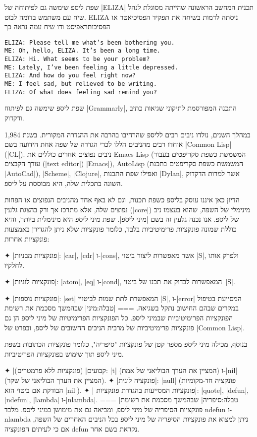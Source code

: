 שפת ליספ שימשה גם לפיתוחה של \E|ELIZA| תכנית המחשב הראשונה שהייתה מסוגלת לנהל
שיח עם משתמש בדומה לבוט. ELIZA ניסתה לדמות בשיחה את תפקיד הפסיכיאטר או
הפסיכותראפיסט ודו שיח עמה נראה כך
\begin{LTR}
  \scriptsize
  \begin{verbatim}
ELIZA: Please tell me what’s been bothering you.
ME: Oh, hello, ELIZA. It’s been a long time.
ELIZA: Hi. What seems to be your problem?
ME: Lately, I’ve been feeling a little depressed.
ELIZA: And how do you feel right now?
ME: I feel sad, but relieved to be writing.
ELIZA: Of what does feeling sad remind you?
\end{verbatim}
\end{LTR}
שפת ליספ שימשה גם לפיתוח
\E|Grammarly|, התכנה המפורסמת לתיקוני שגיאות כתיב ודקדוק.

במהלך השנים, נולדו ניבים רבים לליספ שהרחיבו בהרבה את ההגדרה המקורית. בשנת 1,984
אוחדו רבים מהניבים
הללו לכדי הגדרה של שפה אחת הידועה בשם \E|Common Lisp| (\E|CL|). ניבים נפוצים
אחרים כוללים את Emacs Lisp (המשמשת כשפת סקריפטים בעבור עורך הקבצים (\E|text
editor|) \E|Emacs|), AutoLisp (המשמשת כשפת סקריפטים בתכנת \E|AutoCad|),
\E|Scheme|, \E|Clojure|, ואפילו שפת התכנות \E|Dylan|, אשר למרות הדקדוק השונה
בתכלית שלה, היא מבוססת על ליספ.

הדיון כאן איננו עוסק בליספ כשפת תכנות, וגם לא באף אחד מהניבים הנפוצים או הפחות
נפוצים שלה, אלא מתרכז אך ורק בהצגת גלעין (\E|core|) מינימלי של השפה, שהוא בעצמו
ניב של ליספ. אנו נכנה גלעין זה בשם \ע|מיני ליספ|. שפת מיני ליספ היא מינימלית
ביותר, והיא כוללת שמונה פונקציות פרימיטיביות בלבד, כלומר פונקציות שלא ניתן
להגדירן באמצעות פונקציות אחרות:

✦ \ע|פונקציות מבניות|: \E|car|, \E|cdr| ו-\E|cons|, אשר מאפשרות ליצור ביטוי
\E|S|, ולפרק אותו לחלקיו.

✦ \ע|פונקציות לוגיות|: \E|atom|, \E|eq| ו-\E|cond|, המאפשרות לבדוק את תכנו של
ביטוי~\E|S|.

✦ \ע|פונקציות נוספות|: \E|set| המאפשרת לתת שמות לביטויי \E|S|, ו-\E|error| המסייעת
בטיפול במקרים שבהם החישוב נתקל בשגיאה.
===
|טבלה:מיני| שבהמשך מסכמת את רשימת הפונקציות הפרימיטיביות שבמיני ליספ. כל
הפונקציות הפרימיטיות של מיני ליספ הן גם פונקציות פרימיטיביות של מרבית הניבים החשובים
של ליספ, ובפרט של \E|Common Lisp|.

\normalsize
בנוסף, מכילה מיני ליספ מספר קטן של פונקציות "סיפריה", כלומר פונקציות הכתובות
בשפת מיני ליספ תוך שימוש בפונקציות הפריטיביות.

✦ \ע|קבועים| (פונקציות ללא פרמטרים): \E|t| (המציין את הערך הבוליאני של אמת) ו-\E|nil|
(המציין את הערך הבוליאני של שקר).
✦ \ע|פונקציה לוגית|: \E|null| (פונקציה חד-מקומיות הבודקת אם ביטוי הוא \E|nil|).
✦ \ע| פונקציות המסייעות בהגדרת פונקציות|:
\E|quote|, \E|defun|, \E|ndefun|, \E|lambda| ו-\E|nlambda|.
===
|טבלה:סיפריה| שבהמשך מסכמת את רשימת פונקציות הסיפריה של מיני ליספ, ומביאה
גם את מימושן במיני ליספ. מלבד ndefun ו-nlambda ניתן למצוא את פונקציות הסיפריה
של מיני ליספ בכל הניבים האחרים של השפה, אם כי לעיתים הפונקציה defun נקראת בשם
אחר.

